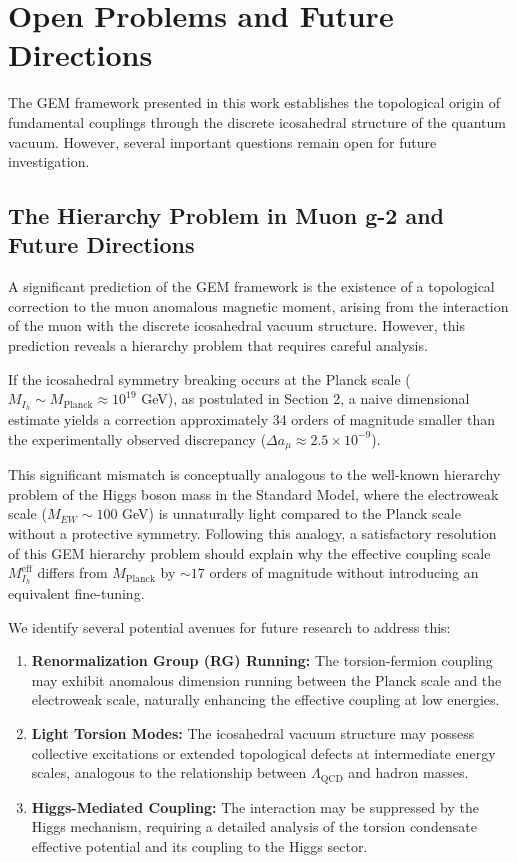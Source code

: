 \section{Open Problems and Future Directions}
\label{sec:open_problems}

The GEM framework presented in this work establishes the topological origin of fundamental couplings through the discrete icosahedral structure of the quantum vacuum. However, several important questions remain open for future investigation.


\subsection{The Hierarchy Problem in Muon g-2 and Future Directions}
\label{subsec:hierarchy_g2}

A significant prediction of the GEM framework is the existence of a topological correction to the muon anomalous magnetic moment, arising from the interaction of the muon with the discrete icosahedral vacuum structure. However, this prediction reveals a hierarchy problem that requires careful analysis.

If the icosahedral symmetry breaking occurs at the Planck scale ($M_{I_h} \sim M_{\text{Planck}} \approx 10^{19}$ GeV), as postulated in Section 2, a naive dimensional estimate yields a correction approximately 34 orders of magnitude smaller than the experimentally observed discrepancy ($\Delta a_\mu \approx 2.5 \times 10^{-9}$).

This significant mismatch is conceptually analogous to the well-known hierarchy problem of the Higgs boson mass in the Standard Model, where the electroweak scale ($M_{EW} \sim 100$ GeV) is unnaturally light compared to the Planck scale without a protective symmetry. Following this analogy, a satisfactory resolution of this GEM hierarchy problem should explain why the effective coupling scale $M_{I_h}^{\text{eff}}$ differs from $M_{\text{Planck}}$ by $\sim 17$ orders of magnitude without introducing an equivalent fine-tuning. 

We identify several potential avenues for future research to address this:
\begin{enumerate}
    \item \textbf{Renormalization Group (RG) Running:} The torsion-fermion coupling may exhibit anomalous dimension running between the Planck scale and the electroweak scale, naturally enhancing the effective coupling at low energies.
    \item \textbf{Light Torsion Modes:} The icosahedral vacuum structure may possess collective excitations or extended topological defects at intermediate energy scales, analogous to the relationship between $\Lambda_{\text{QCD}}$ and hadron masses.
    \item \textbf{Higgs-Mediated Coupling:} The interaction may be suppressed by the Higgs mechanism, requiring a detailed analysis of the torsion condensate effective potential and its coupling to the Higgs sector.
\end{enumerate}

